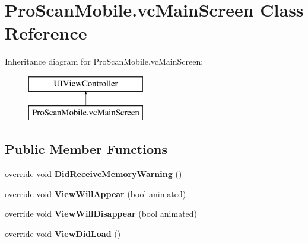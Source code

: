 \hypertarget{class_pro_scan_mobile_1_1vc_main_screen}{\section{Pro\-Scan\-Mobile.\-vc\-Main\-Screen Class Reference}
\label{class_pro_scan_mobile_1_1vc_main_screen}
}
Inheritance diagram for Pro\-Scan\-Mobile.\-vc\-Main\-Screen\-:\begin{figure}[H]
\begin{center}
\leavevmode
\includegraphics[height=2.000000cm]{class_pro_scan_mobile_1_1vc_main_screen}
\end{center}
\end{figure}
\subsection*{Public Member Functions}
\begin{DoxyCompactItemize}
\item 
\hypertarget{class_pro_scan_mobile_1_1vc_main_screen_a2a9f197b9f3b1459423d755cf5bc3b2c}{override void {\bfseries Did\-Receive\-Memory\-Warning} ()}\label{class_pro_scan_mobile_1_1vc_main_screen_a2a9f197b9f3b1459423d755cf5bc3b2c}

\item 
\hypertarget{class_pro_scan_mobile_1_1vc_main_screen_a2f6318f44c159832dc4cdde72714a482}{override void {\bfseries View\-Will\-Appear} (bool animated)}\label{class_pro_scan_mobile_1_1vc_main_screen_a2f6318f44c159832dc4cdde72714a482}

\item 
\hypertarget{class_pro_scan_mobile_1_1vc_main_screen_ab4ca57635214acd610e4b5934719aca2}{override void {\bfseries View\-Will\-Disappear} (bool animated)}\label{class_pro_scan_mobile_1_1vc_main_screen_ab4ca57635214acd610e4b5934719aca2}

\item 
\hypertarget{class_pro_scan_mobile_1_1vc_main_screen_addeb6f027f32ef219faaf3875da59ada}{override void {\bfseries View\-Did\-Load} ()}\label{class_pro_scan_mobile_1_1vc_main_screen_addeb6f027f32ef219faaf3875da59ada}

\end{DoxyCompactItemize}


